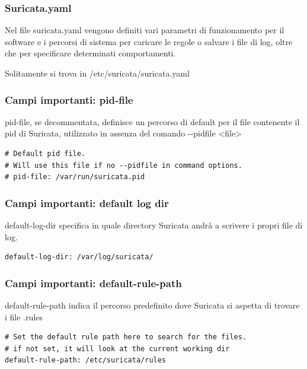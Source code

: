 \documentclass[aspectratio=169]{beamer}
\renewcommand\texttt[1]{{\ttfamily\color{red2}#1}}
\begin{document}
    \begin{frame}
        \frametitle{Suricata.yaml}
        Nel file \texttt{suricata.yaml} vengono definiti vari parametri di funzionamento per il software e i percorsi di sistema per caricare le regole o salvare i file di log, oltre che per specificare determinati comportamenti.
        
        Solitamente si trova in \texttt{/etc/suricata/suricata.yaml}

    \end{frame}

    \begin{frame}[fragile]
        \frametitle{Campi importanti: pid-file}
        \texttt{pid-file}, se decommentata, definisce un percorso di default per il file
        contenente il pid di Suricata, utilizzato in assenza del comando \texttt{-{}-}\texttt{pidfile <file>}
        \vskip 0.3cm
        \begin{lstlisting}
# Default pid file.
# Will use this file if no --pidfile in command options.
# pid-file: /var/run/suricata.pid
        \end{lstlisting}
    \end{frame}
    
    \begin{frame}[fragile]
        \frametitle{Campi importanti: default log dir}
        \texttt{default-log-dir} specifica in quale directory Suricata andrà a scrivere i propri file di log.
        \vskip 0.3cm
        \begin{lstlisting}
default-log-dir: /var/log/suricata/
        \end{lstlisting}
    \end{frame}
    
    \begin{frame}[fragile]
        \frametitle{Campi importanti: default-rule-path}
        \texttt{default-rule-path} indica il percorso predefinito dove Suricata si aspetta di trovare i file \texttt{.rules}
        \vskip 0.3cm
        \begin{lstlisting}
# Set the default rule path here to search for the files.
# if not set, it will look at the current working dir
default-rule-path: /etc/suricata/rules
    \end{lstlisting}
    \end{frame}
    
\end{document}
